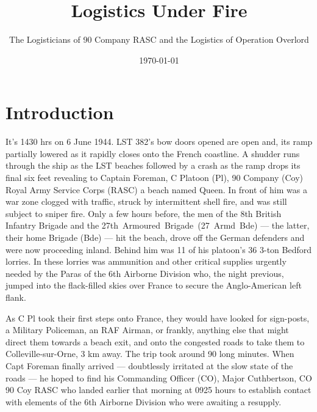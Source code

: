 \documentclass[noraggedright]{turabian-researchpaper}
\title{Logistics Under Fire}  %
\subtitle{The Logisticians of 90 Company RASC and the Logistics of Operation Overlord}
\date{\today} %
\begin{document}
\maketitle

\section{Introduction}



It's 1430 hrs on 6 June 1944. LST 382's bow doors opened are open and, its 
ramp partially lowered as it rapidly closes onto the French coastline.  A 
shudder runs through the ship as the LST beaches followed by a crash as the 
ramp drops its final six feet revealing to Captain Foreman, C Platoon (Pl), 90 
Company (Coy) Royal Army Service Corps (RASC) a beach named 
Queen.  %
In front of him was a war zone 
clogged with traffic, struck by intermittent shell fire, and was still subject 
to sniper fire.  Only a few hours before, the men of the 8th British Infantry 
Brigade and the \mbox{27th Armoured Brigade (27 Armd Bde)} --- the latter, 
their home Brigade (Bde) --- hit the beach, drove off the German defenders 
and were now proceeding inland.  Behind him was 11 of his platoon's 36 3-ton 
Bedford lorries.\autocite[31 May 1944 and 6 June 1944 entries both found in 
June diaries]{90wd} In these lorries was ammunition and other critical %
supplies urgently needed by the Paras of the 6th Airborne Division who, the
night previous, jumped %
into the flack-filled skies over France to secure the Anglo-American left 
flank.

As C Pl took their first steps onto France,
they would have looked for sign-posts, a Military Policeman, %
an RAF Airman, %
or frankly, anything else that might direct them towards a beach exit, 
and onto the congested roads to take them to Colleville-sur-Orne, 3 km away.  
The trip took around 90 long minutes.  When Capt Foreman finally arrived --- 
doubtlessly irritated at the slow state of the roads --- he hoped to find his 
Commanding Officer (CO), Major Cuthbertson, CO 90 Coy RASC who landed earlier 
that morning at 0925 hours to establish contact with elements of the 6th 
Airborne Division who were awaiting a resupply.\autocite[6 June 1944]{90wd}
\end{document}
